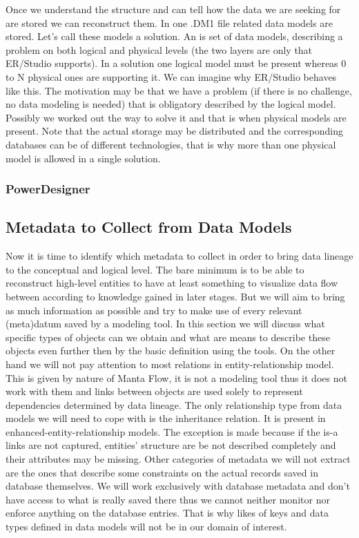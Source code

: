 Once we understand the structure and can tell how the data we are seeking for are stored we can reconstruct them.
In one .DM1 file related data models are stored. Let's call these models a solution. An  is set of data models, describing a problem on both logical and physical levels (the two layers are only that ER/Studio supports). In a solution one logical model must be present whereas 0 to N physical ones are supporting it. 
We can imagine why ER/Studio behaves like this. The motivation may be that we have a problem (if there is no challenge, no data modeling is needed) that is obligatory described by the logical model. Possibly we worked out the way to solve it and that is when physical models are present. 
Note that the actual storage may be distributed and the corresponding databases can be of different technologies, that is why more than one physical model is allowed in a single solution.

\subsubsection{PowerDesigner}


\subsection{Metadata to Collect from Data Models}

Now it is time to identify which metadata to collect in order to bring data lineage to the conceptual and logical level.
The bare minimum is to be able to reconstruct high-level entities to have at least something to visualize data flow between according to knowledge gained in later stages.
But we will aim to bring as much information as possible and try to make use of every relevant (meta)datum saved by a modeling tool. 
In this section we will discuss what specific types of objects can we obtain and what are means to describe these objects even further then by the basic definition using the tools.
On the other hand we will not pay attention to most relations in entity-relationship model. This is given by nature of Manta Flow, it is not a modeling tool thus it does not work with them and links between objects are used solely to represent dependencies determined by data lineage.
The only relationship type from data models we will need to cope with is the inheritance relation. It is present in enhanced-entity-relationship models. The exception is made because if the is-a links are not captured, entities' structure are be not described completely and their attributes may be missing.
Other categories of metadata we will not extract are the ones that describe some constraints on the actual records saved in database themselves. We will work exclusively with database metadata and don't have access to what is really saved there thus we cannot neither monitor nor enforce anything on the database entries. That is why likes of keys and data types defined in data models will not be in our domain of interest.

